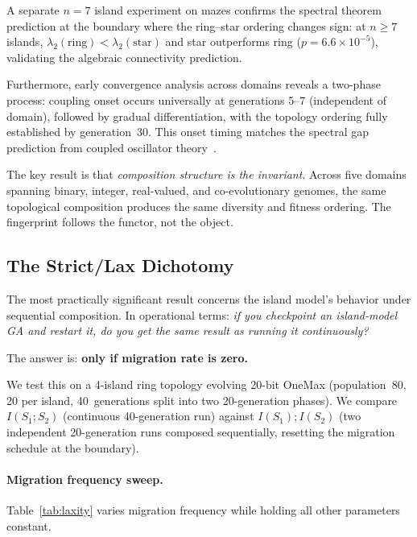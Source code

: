 \documentclass[sigconf,anonymous]{acmart}
\begin{document}
A separate $n{=}7$ island experiment on mazes confirms the spectral theorem prediction at the boundary where the ring--star ordering changes sign: at $n{\geq}7$ islands, $\lambda_2(\text{ring}) < \lambda_2(\text{star})$ and star outperforms ring ($p = 6.6{\times}10^{-5}$), validating the algebraic connectivity prediction.

Furthermore, early convergence analysis across domains reveals a two-phase process: coupling onset occurs universally at generations 5--7 (independent of domain), followed by gradual differentiation, with the topology ordering fully established by generation~30. This onset timing matches the spectral gap prediction from coupled oscillator theory~\cite{sanz2026algebraic}.

The key result is that \emph{composition structure is the invariant}. Across five domains spanning binary, integer, real-valued, and co-evolutionary genomes, the same topological composition produces the same diversity and fitness ordering. The fingerprint follows the functor, not the object.


\subsection{The Strict/Lax Dichotomy}
\label{sec:dichotomy}

The most practically significant result concerns the island model's behavior under sequential composition. In operational terms: \emph{if you checkpoint an island-model GA and restart it, do you get the same result as running it continuously?}

The answer is: \textbf{only if migration rate is zero.}

We test this on a 4-island ring topology evolving 20-bit OneMax (population~80, 20 per island, 40~generations split into two 20-generation phases). We compare $I(S_1 ; S_2)$ (continuous 40-generation run) against $I(S_1) ; I(S_2)$ (two independent 20-generation runs composed sequentially, resetting the migration schedule at the boundary).

\paragraph{Migration frequency sweep.}
Table~\ref{tab:laxity} varies migration frequency while holding all other parameters constant.
\end{document}
